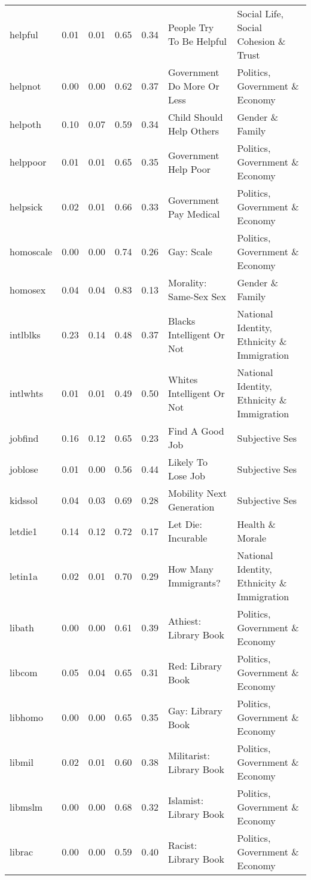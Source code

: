 \documentclass[
  12pt,
]{article}
\begin{document}
\begin{landscape}
\begin{scriptsize}
\begin{longtable}{|p{1.75in}|p{0.3in}|p{0.3in}|p{0.3in}|p{0.3in}|p{2.5in}|p{2.5in}}
helpful & 0.01 & 0.01 & 0.65 & 0.34 & People Try To Be Helpful & Social Life, Social Cohesion \& Trust \\ 
helpnot & 0.00 & 0.00 & 0.62 & 0.37 & Government Do More Or Less & Politics, Government \& Economy \\ 
helpoth & 0.10 & 0.07 & 0.59 & 0.34 & Child Should Help Others & Gender \& Family \\ 
helppoor & 0.01 & 0.01 & 0.65 & 0.35 & Government Help Poor & Politics, Government \& Economy \\ 
helpsick & 0.02 & 0.01 & 0.66 & 0.33 & Government Pay Medical & Politics, Government \& Economy \\ 
homoscale & 0.00 & 0.00 & 0.74 & 0.26 & Gay: Scale & Politics, Government \& Economy \\ 
homosex & 0.04 & 0.04 & 0.83 & 0.13 & Morality: Same-Sex Sex & Gender \& Family \\ 
intlblks & 0.23 & 0.14 & 0.48 & 0.37 & Blacks Intelligent Or Not & National Identity, Ethnicity \& Immigration \\ 
intlwhts & 0.01 & 0.01 & 0.49 & 0.50 & Whites Intelligent Or Not & National Identity, Ethnicity \& Immigration \\ 
jobfind & 0.16 & 0.12 & 0.65 & 0.23 & Find A Good Job & Subjective Ses \\ 
joblose & 0.01 & 0.00 & 0.56 & 0.44 & Likely To Lose Job & Subjective Ses \\ 
kidssol & 0.04 & 0.03 & 0.69 & 0.28 & Mobility Next Generation & Subjective Ses \\ 
letdie1 & 0.14 & 0.12 & 0.72 & 0.17 & Let Die: Incurable & Health \& Morale \\ 
letin1a & 0.02 & 0.01 & 0.70 & 0.29 & How Many Immigrants? & National Identity, Ethnicity \& Immigration \\ 
libath & 0.00 & 0.00 & 0.61 & 0.39 & Athiest: Library Book & Politics, Government \& Economy \\ 
libcom & 0.05 & 0.04 & 0.65 & 0.31 & Red: Library Book & Politics, Government \& Economy \\ 
libhomo & 0.00 & 0.00 & 0.65 & 0.35 & Gay: Library Book & Politics, Government \& Economy \\ 
libmil & 0.02 & 0.01 & 0.60 & 0.38 & Militarist: Library Book & Politics, Government \& Economy \\ 
libmslm & 0.00 & 0.00 & 0.68 & 0.32 & Islamist: Library Book & Politics, Government \& Economy \\ 
librac & 0.00 & 0.00 & 0.59 & 0.40 & Racist: Library Book & Politics, Government \& Economy \\ 

\end{longtable}
\end{scriptsize}
\end{landscape}
\end{document}
